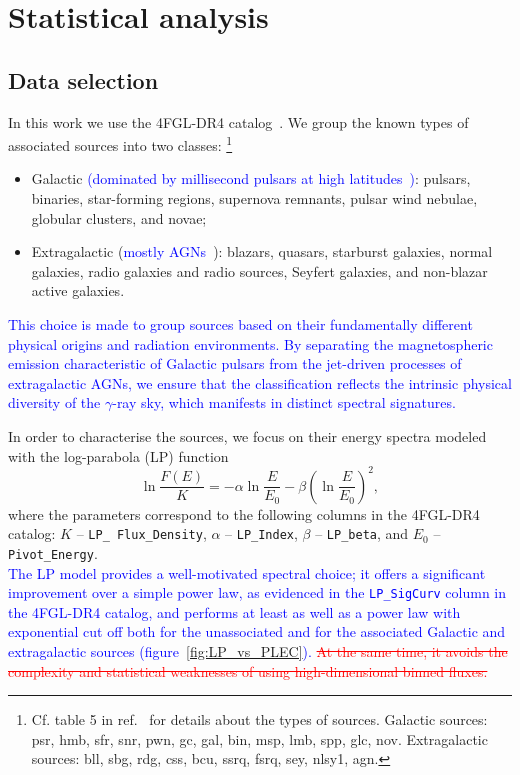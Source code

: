 \documentclass[12pt, a4paper]{article}
\newcommand{\new}[1]{\textcolor{blue}{#1}}
\newcommand{\old}[1]{\textcolor{red}{\st{#1}}}
\newcommand{\be}{\begin{equation}}
\newcommand{\ee}{\end{equation}}
\begin{document}
\section{Statistical analysis}
\label{sec:approach}

\subsection{Data selection}
\label{sec:data}


In this work we use the 4FGL-DR4 catalog~\cite{Fermi-LAT:2022byn,Ballet:2023qzs}. We group the known types of associated sources into two classes:%
\footnote{Cf. table 5 in ref.~\cite{Fermi-LAT:2022byn} for details about the types of sources. Galactic sources: psr, hmb, sfr, snr, pwn, gc, gal, bin, msp, lmb, spp, glc, nov. Extragalactic sources: bll, sbg, rdg, css, bcu, ssrq, fsrq, sey, nlsy1, agn.}
\begin{itemize}
    \item Galactic \new{(dominated by millisecond pulsars at high latitudes~\cite{smith2023third,Fermi-LAT:2019yla,DGRB-review,Hooper:2024,Cholis:2014noa,Caraveo:2013lra})}: pulsars, binaries, star-forming regions, supernova remnants, pulsar wind nebulae, globular clusters, and novae;
    \item Extragalactic (\new{mostly AGNs~\cite{fossati1998unifying,Fermi-LAT:2019yla,DGRB-review,Dermer:2009zz,Fermi-LAT:2014ryh,Ajello:2015mfa,Lisanti:2016jub}}): blazars, quasars, starburst galaxies, normal galaxies, radio galaxies and radio sources, Seyfert galaxies, and non-blazar active galaxies.
\end{itemize}
%
%
\new{This choice is made to group sources based on their fundamentally different physical origins and radiation environments. By separating the magnetospheric emission characteristic of Galactic pulsars from the jet-driven processes of extragalactic AGNs, we ensure that the classification reflects the intrinsic physical diversity of the $\gamma$-ray sky, which manifests in distinct spectral signatures.}

In order to characterise the sources, we focus on their energy spectra modeled with the log-parabola (LP) function
\be
\label{eq:log_par}
\ln \frac{F(E)}{K} = - \alpha \ln \frac{E}{E_0} - \beta \left(\ln \frac{E}{E_0} \right)^2,
\ee
where the parameters correspond to the following columns in the 4FGL-DR4 catalog:
$K$ -- \texttt{LP\_ Flux\_Density},
$\alpha$ -- \texttt{LP\_Index},
$\beta$ -- \texttt{LP\_beta},
and $E_0$ -- \texttt{Pivot\_Energy}.
%
\\
\new{The LP model provides a well-motivated spectral choice; it offers a significant improvement over a simple power law, as evidenced in the \texttt{LP\_SigCurv} column in the 4FGL-DR4 catalog, and performs at least as well as a power law with exponential cut off both for the unassociated and for the associated Galactic and extragalactic sources (figure~\ref{fig:LP_vs_PLEC}).} \old{At the same time, it avoids the complexity and statistical weaknesses of using high-dimensional binned fluxes.} 
\end{document}
